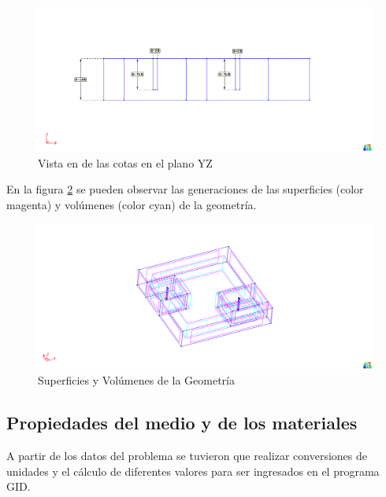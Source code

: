 \documentclass[10pt,a4paper,final]{article}
\begin{document}
%
\begin{figure}[tbhp]
\centerline{\includegraphics[scale=0.75]{img/cotas_grales_YZ}}
\caption{Vista en de las cotas en el plano YZ}
\label{cotas_grales_YZ}
\end{figure}
%
En la figura \ref{superficies_y_volumenes} se pueden observar las generaciones de las superficies (color magenta) y volúmenes (color cyan)
de la geometría.
%
\begin{figure}[tbhp]
\centerline{\includegraphics[scale=0.75]{img/superficies_y_volumenes}}
\caption{Superficies y Volúmenes de la Geometría}
\label{superficies_y_volumenes}
\end{figure}
%
%
%

%
\subsection{Propiedades del medio y de los materiales}
A partir de los datos del problema se tuvieron que realizar conversiones de unidades y el cálculo de diferentes valores para ser ingresados en el programa GID.
%
\end{document}

